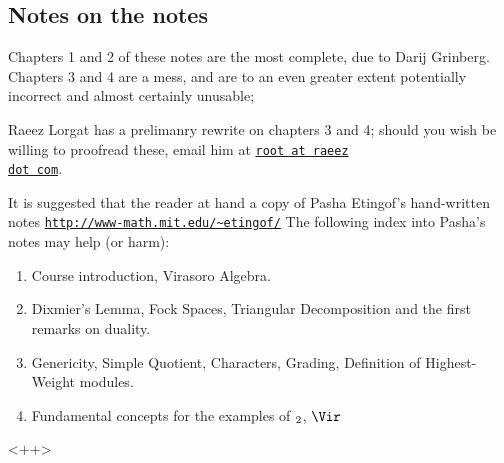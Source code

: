 \documentclass[etingof-lie.tex]{subfiles}
\begin{document}
\subsection{Notes on the notes}

Chapters 1 and 2 of these notes are the most complete, due to Darij Grinberg.
Chapters 3 and 4 are a mess, and are to an even greater extent potentially
incorrect and almost certainly unusable;

Raeez Lorgat has a prelimanry rewrite on chapters 3 and 4; should you wish be
willing to proofread these, email him at \texttt{\url{root at raeez
dot com}}.

It is suggested that the reader at hand a copy of Pasha Etingof's
hand-written notes \newline\texttt{\url{http://www-math.mit.edu/~etingof/}}
The following index into Pasha's notes may help (or harm):

\nc{}

\begin{enumerate}
  \item Course introduction, Virasoro Algebra.
  \item Dixmier's Lemma, Fock Spaces,
    Triangular Decomposition and the first remarks on duality.
  \item Genericity, Simple Quotient,
    Characters, Grading, Definition of Highest-Weight modules.
  \item Fundamental concepts for the examples of $\sl_2$, $\Vir$
\end{enumerate}<++>
\end{document}
